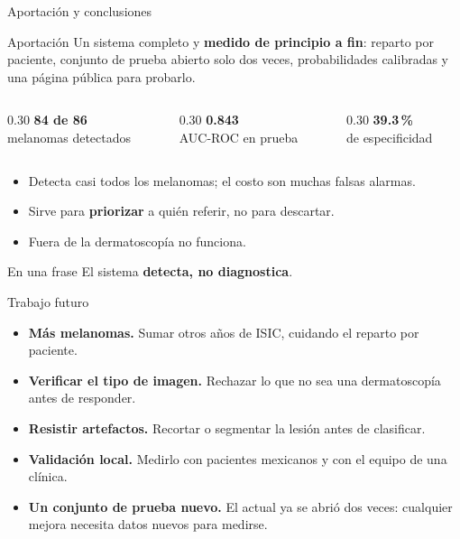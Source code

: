 \documentclass[aspectratio=169,10pt]{beamer}
\newcommand{\cifra}[1]{{\fontsize{24}{26}\selectfont\bfseries\color{azulfi}#1}}
\begin{document}
\begin{frame}{Aportación y conclusiones}
  \begin{block}{Aportación}
    Un sistema completo y \textbf{medido de principio a fin}: reparto por paciente, conjunto de prueba abierto solo dos veces, probabilidades calibradas y una página pública para probarlo.
  \end{block}
  \vspace{0.5em}
  \begin{columns}[c]
    \begin{column}{0.30\textwidth}\centering
      \cifra{84 de 86}\\ melanomas detectados
    \end{column}
    \begin{column}{0.30\textwidth}\centering
      \cifra{0.843}\\ AUC-ROC en prueba
    \end{column}
    \begin{column}{0.30\textwidth}\centering
      \cifra{39.3\,\%}\\ de especificidad
    \end{column}
  \end{columns}
  \vspace{0.8em}
  \begin{itemize}
    \item Detecta casi todos los melanomas; el costo son muchas falsas alarmas.
    \item Sirve para \textbf{priorizar} a quién referir, no para descartar.
    \item Fuera de la dermatoscopía no funciona.
  \end{itemize}
  \begin{exampleblock}{En una frase}
    El sistema \textbf{detecta, no diagnostica}.
  \end{exampleblock}
\end{frame}

\begin{frame}{Trabajo futuro}
  \begin{itemize}
    \setlength{\itemsep}{0.9em}
    \item \textbf{Más melanomas.} Sumar otros años de ISIC, cuidando el reparto por paciente.
    \item \textbf{Verificar el tipo de imagen.} Rechazar lo que no sea una dermatoscopía antes de responder.
    \item \textbf{Resistir artefactos.} Recortar o segmentar la lesión antes de clasificar.
    \item \textbf{Validación local.} Medirlo con pacientes mexicanos y con el equipo de una clínica.
    \item \textbf{Un conjunto de prueba nuevo.} El actual ya se abrió dos veces: cualquier mejora necesita datos nuevos para medirse.
  \end{itemize}
\end{frame}
\end{document}
